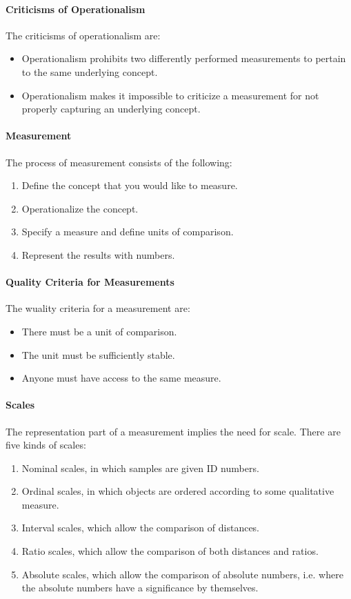 \paragraph{Criticisms of Operationalism}
The criticisms of operationalism are:
\begin{itemize}
	\item Operationalism prohibits two differently performed measurements to pertain to the same underlying concept.
	\item Operationalism makes it impossible to criticize a measurement for not properly capturing an underlying concept.
\end{itemize}

\paragraph{Measurement}
The process of measurement consists of the following:
\begin{enumerate}
	\item Define the concept that you would like to measure.
	\item Operationalize the concept.
	\item Specify a measure and define units of comparison.
	\item Represent the results with numbers.
\end{enumerate}

\paragraph{Quality Criteria for Measurements}
The wuality criteria for a measurement are:
\begin{itemize}
	\item There must be a unit of comparison.
	\item The unit must be sufficiently stable.
	\item Anyone must have access to the same measure.
\end{itemize}

\paragraph{Scales}
The representation part of a measurement implies the need for scale. There are five kinds of scales:
\begin{enumerate}
	\item Nominal scales, in which samples are given ID numbers.
	\item Ordinal scales, in which objects are ordered according to some qualitative measure.
	\item Interval scales, which allow the comparison of distances.
	\item Ratio scales, which allow the comparison of both distances and ratios.
	\item Absolute scales, which allow the comparison of absolute numbers, i.e. where the absolute numbers have a significance by themselves.
\end{enumerate}

